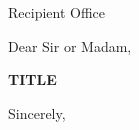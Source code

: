 \documentclass{letter}
\date{{{DATE}}}
\begin{document}
\begin{letter}{Recipient Office}
\opening{Dear Sir or Madam,}
\textbf{{{TITLE}}}

\closing{Sincerely,}
\end{letter}
\end{document}
